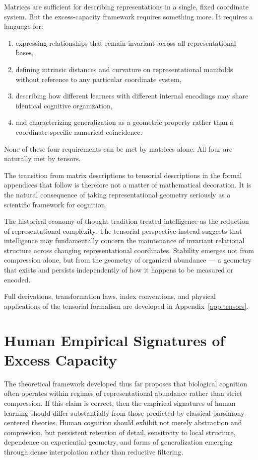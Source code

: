 \documentclass[12pt,a4paper]{article}
\begin{document}
Matrices are sufficient for describing representations in a single, fixed coordinate system. But the excess-capacity framework requires something more. It requires a language for:
\begin{enumerate}
\item expressing relationships that remain invariant across all representational bases,
\item defining intrinsic distances and curvature on representational manifolds without reference to any particular coordinate system,
\item describing how different learners with different internal encodings may share identical cognitive organization,
\item and characterizing generalization as a geometric property rather than a coordinate-specific numerical coincidence.
\end{enumerate}

None of these four requirements can be met by matrices alone. All four are naturally met by tensors.

The transition from matrix descriptions to tensorial descriptions in the formal appendices that follow is therefore not a matter of mathematical decoration. It is the natural consequence of taking representational geometry seriously as a scientific framework for cognition.

The historical economy-of-thought tradition treated intelligence as the reduction of representational complexity. The tensorial perspective instead suggests that intelligence may fundamentally concern the maintenance of invariant relational structure across changing representational coordinates. Stability emerges not from compression alone, but from the geometry of organized abundance --- a geometry that exists and persists independently of how it happens to be measured or encoded.

Full derivations, transformation laws, index conventions, and physical applications of the tensorial formalism are developed in Appendix~\ref{app:tensors}.

\section{Human Empirical Signatures of Excess Capacity}

The theoretical framework developed thus far proposes that biological cognition often operates within regimes of representational abundance rather than strict compression. If this claim is correct, then the empirical signatures of human learning should differ substantially from those predicted by classical parsimony-centered theories. Human cognition should exhibit not merely abstraction and compression, but persistent retention of detail, sensitivity to local structure, dependence on experiential geometry, and forms of generalization emerging through dense interpolation rather than reductive filtering.
\end{document}
